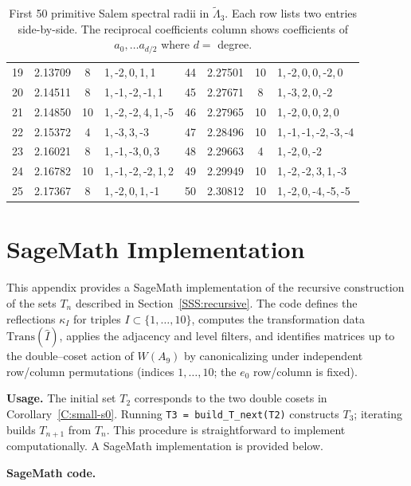 \documentclass[11pt]{amsart}
\numberwithin{equation}{section}
\begin{document}
\begin{appendices}
{{\begin{table}[h]
\begin{tabular}{|c|c|c|l||c|c|c|l|}
19 & 2.13709 & 8 & 1,\,-2,\,0,\,1,\,1 
& 44 & 2.27501 & 10 & 1,\,-2,\,0,\,0,\,-2,\,0 \\
20 & 2.14511 & 8 & 1,\,-1,\,-2,\,-1,\,1 
& 45 & 2.27671 & 8 & 1,\,-3,\,2,\,0,\,-2 \\
21 & 2.14850 & 10 & 1,\,-2,\,-2,\,4,\,1,\,-5 
& 46 & 2.27965 & 10 & 1,\,-2,\,0,\,0,\,2,\,0 \\
22 & 2.15372 & 4 & 1,\,-3,\,3,\,-3 
& 47 & 2.28496 & 10 & 1,\,-1,\,-1,\,-2,\,-3,\,-4 \\
23 & 2.16021 & 8 & 1,\,-1,\,-3,\,0,\,3 
& 48 & 2.29663 & 4 & 1,\,-2,\,0,\,-2 \\
24 & 2.16782 & 10 & 1,\,-1,\,-2,\,-2,\,1,\,2 
& 49 & 2.29949 & 10 & 1,\,-2,\,-2,\,3,\,1,\,-3 \\
25 & 2.17367 & 8 & 1,\,-2,\,0,\,1,\,-1 
& 50 & 2.30812 & 10 & 1,\,-2,\,0,\,-4,\,-5,\,-5 \\
\hline
\end{tabular}
\caption{First 50 primitive Salem spectral radii in $\tilde \Lambda_3$. Each row lists two entries side-by-side. The reciprocal coefficients column shows coefficients of $a_0, \dots a_{d/2}$ where $d=$ degree.}
\label{T:Primitive_Level3}
\end{table}
}
}

\vfill\eject
\section{SageMath Implementation}\label{A:code}


\noindent
This appendix provides a SageMath implementation of the recursive construction of the sets
$T_n$ described in Section~\ref{SSS:recursive}. The code defines the reflections
$\kappa_I$ for triples $I\subset\{1,\dots,10\}$, computes the transformation
data $\mathrm{Trans}(\widehat I)$, applies the adjacency and level filters, and
identifies matrices up to the double--coset action of $W(A_9)$ by canonicalizing
under independent row/column permutations (indices $1,\dots,10$; the $e_0$ row/column is fixed).

\medskip
\noindent\textbf{Usage.}
The initial set $T_2$ corresponds to the two double cosets in
Corollary~\ref{C:small-s0}.
Running \texttt{T3 = build\_T\_next(T2)} constructs $T_3$; iterating builds $T_{n+1}$ from $T_n$.
This procedure is straightforward to implement computationally. A SageMath implementation is provided below.

{\footnotesize{

\medskip
\noindent\textbf{SageMath code.}

}}
\end{appendices}
\end{document}
